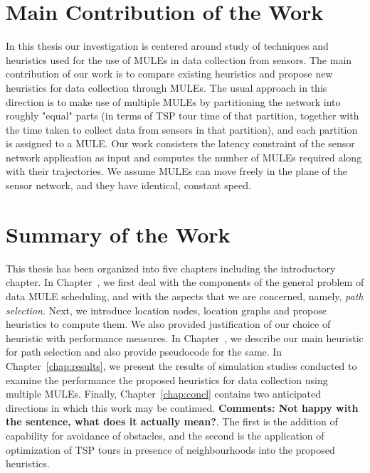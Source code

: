 \section{Main Contribution of the Work}
In this thesis our investigation is centered around study of techniques and heuristics used for the use of MULEs in data collection from sensors. The main contribution of our work is to compare existing heuristics and propose new heuristics for data collection through MULEs. The usual approach in this direction is to make use of multiple MULEs by partitioning the network into roughly "equal" parts (in terms of TSP tour time of that partition, together with the time taken to collect data from sensors in that partition), and each partition is assigned to a MULE. Our work consisters the latency constraint of the sensor network application as input and computes the number of MULEs required along with their trajectories. We assume MULEs can move freely in the plane of the sensor network, and they have identical, constant speed.

\section{Summary of the Work}
This thesis has been organized into five chapters including the 
introductory chapter. In Chapter~, we first deal with the components of the general problem of data MULE scheduling, and with the aspects that we are concerned, namely, {\em path selection}. Next, we introduce location nodes, location graphs and propose heuristics to compute them. We also provided justification of our choice of heuristic with performance measures. In Chapter~, we describe our main heuristic for path selection and also provide pseudocode for the same. 
In Chapter~\ref{chap:results}, we present the results of simulation studies conducted to examine the performance the proposed heuristics for data collection using multiple MULEs. Finally, 
Chapter~\ref{chap:concl} contains two anticipated directions in which this work may be continued. 
{\bf Comments: Not happy with the sentence, what does it actually mean?}. The first is the addition of capability for avoidance of obstacles, and the second is the application of optimization of TSP tours in presence of neighbourhoods into the proposed heuristics.

